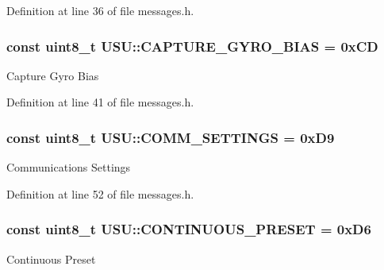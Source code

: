 \-Definition at line 36 of file messages.\-h.

\hypertarget{namespace_u_s_u_a92bab9f2a72649fb48c86fd407ef8c59}{
\subsubsection[{\-C\-A\-P\-T\-U\-R\-E\-\_\-\-G\-Y\-R\-O\-\_\-\-B\-I\-A\-S}]{\setlength{\rightskip}{0pt plus 5cm}const uint8\-\_\-t {\bf \-U\-S\-U\-::\-C\-A\-P\-T\-U\-R\-E\-\_\-\-G\-Y\-R\-O\-\_\-\-B\-I\-A\-S} = 0x\-C\-D}}\label{namespace_u_s_u_a92bab9f2a72649fb48c86fd407ef8c59}
\-Capture \-Gyro \-Bias 

\-Definition at line 41 of file messages.\-h.

\hypertarget{namespace_u_s_u_a3709ea83b0ef142216dad235ed73a34b}{
\subsubsection[{\-C\-O\-M\-M\-\_\-\-S\-E\-T\-T\-I\-N\-G\-S}]{\setlength{\rightskip}{0pt plus 5cm}const uint8\-\_\-t {\bf \-U\-S\-U\-::\-C\-O\-M\-M\-\_\-\-S\-E\-T\-T\-I\-N\-G\-S} = 0x\-D9}}\label{namespace_u_s_u_a3709ea83b0ef142216dad235ed73a34b}
\-Communications \-Settings 

\-Definition at line 52 of file messages.\-h.

\hypertarget{namespace_u_s_u_a5bc881189e111127f0bd759100dbab6b}{
\subsubsection[{\-C\-O\-N\-T\-I\-N\-U\-O\-U\-S\-\_\-\-P\-R\-E\-S\-E\-T}]{\setlength{\rightskip}{0pt plus 5cm}const uint8\-\_\-t {\bf \-U\-S\-U\-::\-C\-O\-N\-T\-I\-N\-U\-O\-U\-S\-\_\-\-P\-R\-E\-S\-E\-T} = 0x\-D6}}\label{namespace_u_s_u_a5bc881189e111127f0bd759100dbab6b}
\-Continuous \-Preset 

